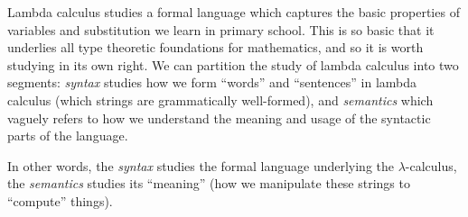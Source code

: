 
\begin{node}\label{untyped-lambda-0003}%
Lambda calculus studies a formal language which captures the basic
properties of variables and substitution we learn in primary
school. This is so basic that it underlies all type theoretic
foundations for mathematics, and so it is worth studying in its own
right. We can partition the study of lambda calculus into two segments:
\emph{syntax} studies how we form ``words'' and ``sentences'' in lambda
calculus (which strings are grammatically well-formed), and
\emph{semantics} which vaguely refers to how we understand the meaning
and usage of the syntactic parts of the language.

In other words, the \emph{syntax} studies the formal language underlying
the $\lambda$-calculus, the \emph{semantics} studies its ``meaning''
(how we manipulate these strings to ``compute'' things).
\end{node}

